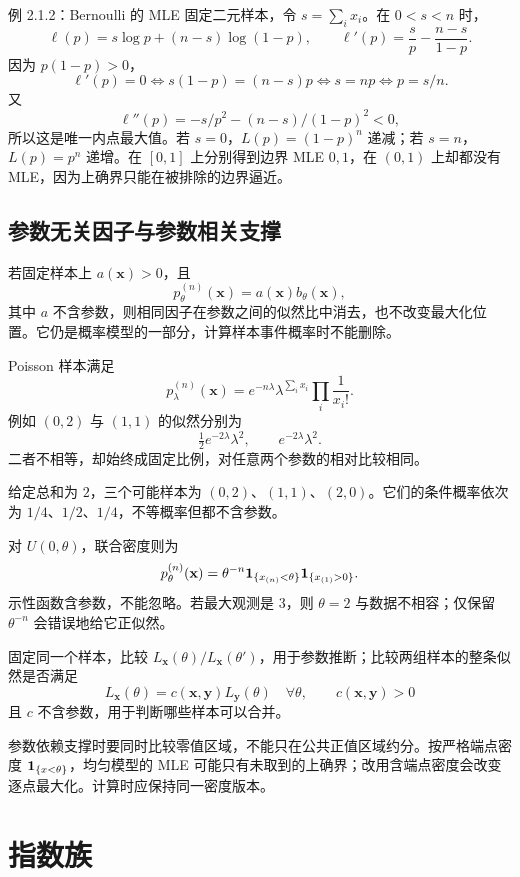 \begin{examplebox}{例 2.1.2：Bernoulli 的 MLE}
固定二元样本，令 $s=\sum_i x_i$。在 $0<s<n$ 时，
\[
 \ell(p)=s\log p+(n-s)\log(1-p),\qquad
 \ell'(p)=\frac sp-\frac{n-s}{1-p}.
\]
因为 $p(1-p)>0$，
\[
 \ell'(p)=0
 \iff s(1-p)=(n-s)p
 \iff s=np
 \iff p=s/n.
\]
又
\[
 \ell''(p)=-s/p^2-(n-s)/(1-p)^2<0,
\]
所以这是唯一内点最大值。若 $s=0$，$L(p)=(1-p)^n$ 递减；若 $s=n$，$L(p)=p^n$ 递增。在 $[0,1]$ 上分别得到边界 MLE $0,1$，在 $(0,1)$ 上却都没有 MLE，因为上确界只能在被排除的边界逼近。
\end{examplebox}

\subsection{参数无关因子与参数相关支撑}
若固定样本上 $a(\mathbf x)>0$，且
\[
 p_\theta^{(n)}(\mathbf x)=a(\mathbf x)b_\theta(\mathbf x),
\]
其中 $a$ 不含参数，则相同因子在参数之间的似然比中消去，也不改变最大化位置。它仍是概率模型的一部分，计算样本事件概率时不能删除。

Poisson 样本满足
\[
 p_\lambda^{(n)}(\mathbf x)
 =e^{-n\lambda}\lambda^{\sum_i x_i}\prod_i\frac1{x_i!}.
\]
例如 $(0,2)$ 与 $(1,1)$ 的似然分别为
\[
 \tfrac12e^{-2\lambda}\lambda^2,\qquad e^{-2\lambda}\lambda^2.
\]
二者不相等，却始终成固定比例，对任意两个参数的相对比较相同。

给定总和为 $2$，三个可能样本为 $(0,2)$、$(1,1)$、$(2,0)$。它们的条件概率依次为 $1/4$、$1/2$、$1/4$，不等概率但都不含参数。

对 $U(0,\theta)$，联合密度则为
\[
 p_\theta^{(n)}(\mathbf x)
 =\theta^{-n}\mathbf 1_{\{x_{(n)}<\theta\}}\mathbf 1_{\{x_{(1)}>0\}}.
\]
示性函数含参数，不能忽略。若最大观测是 $3$，则 $\theta=2$ 与数据不相容；仅保留 $\theta^{-n}$ 会错误地给它正似然。

\begin{notebox}
固定同一个样本，比较 $L_{\mathbf x}(\theta)/L_{\mathbf x}(\theta')$，用于参数推断；比较两组样本的整条似然是否满足
\[
 L_{\mathbf x}(\theta)=c(\mathbf x,\mathbf y)L_{\mathbf y}(\theta)
 \quad\forall\theta,\qquad c(\mathbf x,\mathbf y)>0
\]
且 $c$ 不含参数，用于判断哪些样本可以合并。

参数依赖支撑时要同时比较零值区域，不能只在公共正值区域约分。按严格端点密度 $\mathbf 1_{\{x<\theta\}}$，均匀模型的 MLE 可能只有未取到的上确界；改用含端点密度会改变逐点最大化。计算时应保持同一密度版本。
\end{notebox}

\section{指数族}

